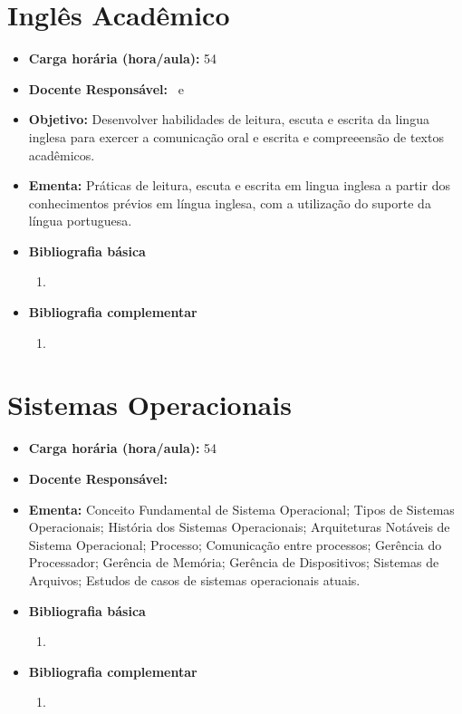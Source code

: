\documentclass[11pt,fleqn]{book} %
\begin{document}

\newpage
\section{Inglês Acadêmico}\label{disc:inglacad}
\begin{itemize}
	\item \textbf{Carga horária (hora/aula):} 54
	\item \textbf{Docente Responsável:}~ e 
	\item \textbf{Objetivo:} Desenvolver habilidades de leitura, escuta e escrita da lingua inglesa para exercer a comunicação oral e escrita e compreeensão de textos acadêmicos.
	\item \textbf{Ementa:} 
	Práticas de leitura, escuta e escrita em lingua inglesa a partir dos conhecimentos prévios em língua inglesa, com a utilização do suporte da língua portuguesa.
	\item \textbf{Bibliografia básica}
	\begin{enumerate}
		\item 
	\end{enumerate}
	\item \textbf{Bibliografia complementar}
	\begin{enumerate}
		\item 
	\end{enumerate}	
\end{itemize}


\newpage
\section{Sistemas Operacionais}\label{disc:sistop}

\begin{itemize}
	\item \textbf{Carga horária (hora/aula):} 54
	\item \textbf{Docente Responsável:}~
	\item \textbf{Ementa:} 
	Conceito Fundamental de Sistema Operacional; 
	Tipos de Sistemas Operacionais; 
	História dos Sistemas Operacionais; 
	Arquiteturas Notáveis de Sistema Operacional; 
	Processo; 
	Comunicação entre processos; 
	Gerência do Processador; 
	Gerência de Memória; 
	Gerência de Dispositivos; 
	Sistemas de Arquivos; 
	Estudos de casos de sistemas operacionais atuais.
	\item \textbf{Bibliografia básica}
	\begin{enumerate}
		\item 
	\end{enumerate}
	\item \textbf{Bibliografia complementar}
	\begin{enumerate}
		\item 
	\end{enumerate}	
\end{itemize}
\end{document}
